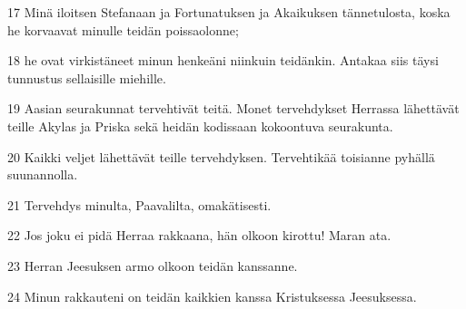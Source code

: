 \par 17 Minä iloitsen Stefanaan ja Fortunatuksen ja Akaikuksen tännetulosta, koska he korvaavat minulle teidän poissaolonne;
\par 18 he ovat virkistäneet minun henkeäni niinkuin teidänkin. Antakaa siis täysi tunnustus sellaisille miehille.
\par 19 Aasian seurakunnat tervehtivät teitä. Monet tervehdykset Herrassa lähettävät teille Akylas ja Priska sekä heidän kodissaan kokoontuva seurakunta.
\par 20 Kaikki veljet lähettävät teille tervehdyksen. Tervehtikää toisianne pyhällä suunannolla.
\par 21 Tervehdys minulta, Paavalilta, omakätisesti.
\par 22 Jos joku ei pidä Herraa rakkaana, hän olkoon kirottu! Maran ata.
\par 23 Herran Jeesuksen armo olkoon teidän kanssanne.
\par 24 Minun rakkauteni on teidän kaikkien kanssa Kristuksessa Jeesuksessa.


